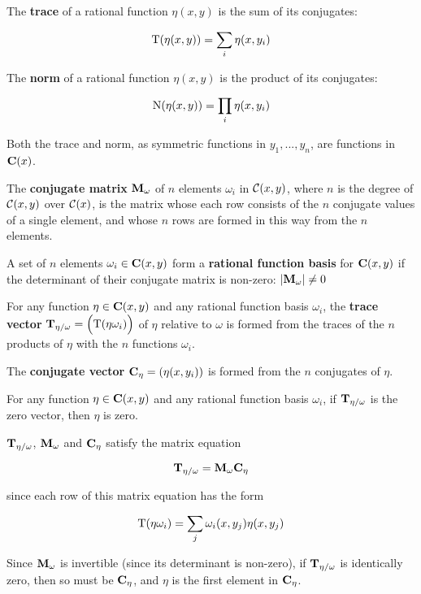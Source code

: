 The {\bf trace} of a rational function $\eta(x,y)$ is the sum of
its conjugates:

$${\rm T}(\eta(x,y)) = \sum_i \eta(x,y_i)$$

The {\bf norm} of a rational function $\eta(x,y)$ is the product of
its conjugates:

$${\rm N}(\eta(x,y)) = \prod_i \eta(x,y_i)$$

Both the trace and norm, as symmetric functions in $y_1,...,y_n$, are
functions in ${\bf C}(x)$.

The {\bf conjugate matrix} ${\bf M}_\omega$ of $n$ elements $\omega_i$
in ${\cal C}(x,y)$, where $n$ is the degree of ${\cal C}(x,y)$ over
${\cal C}(x)$, is the matrix whose each row consists of the $n$
conjugate values of a single element, and whose $n$ rows are formed in
this way from the $n$ elements.

A set of $n$ elements $\omega_i \in {\bf C}(x,y)$ form a {\bf rational
function basis} for ${\bf C}(x,y)$ if the determinant of their
conjugate matrix is non-zero: $|{\bf M}_\omega| \ne 0$

\enddefinition


For any function $\eta \in {\bf C}(x,y)$ and any rational function
basis $\omega_i$, the {\bf trace vector}
${\bf T}_{\eta/\omega} = \Big({\rm T}(\eta \omega_i)\Big)$ 
of $\eta$ relative to $\omega$
is formed from the
traces of the $n$ products of $\eta$ with the $n$ functions
$\omega_i$.

The {\bf conjugate vector} ${\bf C}_\eta = (\eta(x,y_i))$ is formed from the
$n$ conjugates of $\eta$.

\enddefinition

\theorem
\label{function is zero if trace vector is zero}

For any function $\eta \in {\bf C}(x,y)$ and any rational function
basis $\omega_i$, if ${\bf T}_{\eta/\omega}$ is the zero vector,
then $\eta$ is zero.

\proof

${\bf T}_{\eta/\omega}$, ${\bf M}_\omega$ and ${\bf C}_\eta$
satisfy the matrix equation

$${\bf T}_{\eta/\omega} = {\bf M}_\omega {\bf C}_\eta$$

since each row of this matrix equation has the form

$$ {\rm T}(\eta \omega_i) = \sum_j \omega_i(x,y_j)\eta(x,y_j) $$

Since ${\bf M}_\omega$ is invertible (since its determinant is
non-zero), if ${\bf T}_{\eta/\omega}$ is identically zero, then so must be
${\bf C}_\eta$, and $\eta$ is the first element in ${\bf C}_\eta$.

